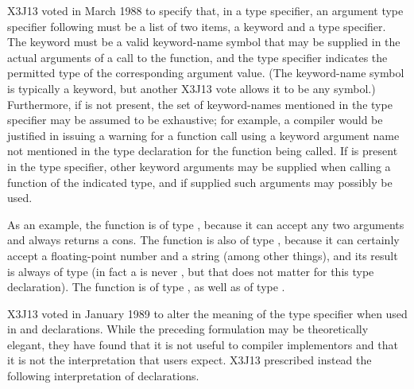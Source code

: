 \begin{flushdesc}
\begin{newer}
X3J13 voted in March 1988 
to specify that, in a  type specifier,
an argument type specifier following 
must be a list of two items, a keyword and a type specifier.
The keyword must be a valid keyword-name symbol that may be
supplied in the actual arguments of a call to the function,
and the type specifier indicates the permitted type of
the corresponding argument value.  (The keyword-name symbol
is typically a keyword,
but another X3J13 vote 
allows it to be any symbol.)
Furthermore, if  is not present,
the set of keyword-names mentioned in the 
type specifier may be assumed to be exhaustive;
for example, a compiler would be justified in issuing
a warning for a function call using a keyword argument name
not mentioned in the type declaration for the function being called.
If 
is present in the 
type specifier, other keyword arguments may be supplied
when calling a function of the indicated type, and if supplied such
arguments may possibly be used.
\end{newer}

\begin{obsolete}
As an example, the function  is of type ,
because it can accept any two arguments and always returns a cons.
The function  is
also of type , because it can certainly
accept a floating-point number and a string (among other things), and its
result is always of type  (in fact a  is never ,
but that does not matter for this type declaration).
The function  is of type
, as well as of type
.
\end{obsolete}

\begin{new}
X3J13 voted in January 1989
to alter the meaning of the
 type specifier when used in  and 
declarations.  While the preceding formulation may be theoretically
elegant, they have found that it is not useful to compiler implementors
and that it is not the interpretation that users expect.  X3J13 prescribed instead the
following interpretation of declarations.


\end{new}
\end{flushdesc}
